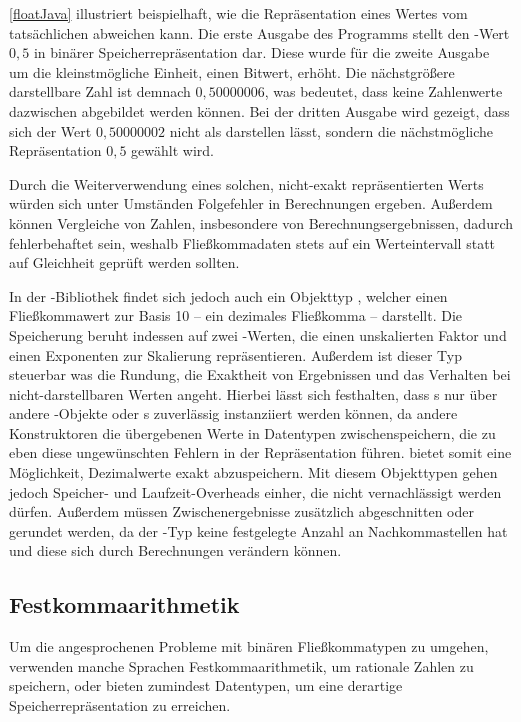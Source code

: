 \autoref{floatJava} illustriert beispielhaft, wie die Repräsentation eines Wertes vom tatsächlichen abweichen kann. Die erste Ausgabe des Programms stellt den -Wert $0,5$ in binärer Speicherrepräsentation dar. Diese wurde für die zweite Ausgabe um die kleinstmögliche Einheit, einen Bitwert, erhöht. Die nächstgrößere darstellbare Zahl ist demnach $0,50000006$, was bedeutet, dass keine Zahlenwerte dazwischen abgebildet werden können. Bei der dritten Ausgabe wird gezeigt, dass sich der Wert $0,50000002$ nicht als  darstellen lässt, sondern die nächstmögliche Repräsentation $0,5$ gewählt wird.

Durch die Weiterverwendung eines solchen, nicht-exakt repräsentierten Werts würden sich unter Umständen Folgefehler in Berechnungen ergeben. Außerdem können Vergleiche von Zahlen, insbesondere von Berechnungsergebnissen, dadurch fehlerbehaftet sein, weshalb Fließkommadaten stets auf ein Werteintervall statt auf Gleichheit geprüft werden sollten.

In der -Bibliothek findet sich jedoch auch ein Objekttyp , welcher einen Fließkommawert zur Basis 10 -- ein dezimales Fließkomma -- darstellt. Die Speicherung beruht in­des­sen auf zwei -Werten, die einen unskalierten Faktor und einen Exponenten zur Skalierung repräsentieren. Außerdem ist dieser Typ steuerbar was die Rundung, die Exaktheit von Ergebnissen und das Verhalten bei nicht-darstellbaren Werten angeht. Hierbei lässt sich festhalten, dass s nur über andere -Objekte oder s zuverlässig instanziiert werden können, da andere Konstruktoren die übergebenen Werte in Datentypen zwischenspeichern, die zu eben diese ungewünschten Fehlern in der Repräsentation führen.  bietet somit eine Möglichkeit, Dezimalwerte exakt abzuspeichern. Mit diesem Objekttypen gehen jedoch Speicher- und Laufzeit-Overheads einher, die nicht vernachlässigt werden dürfen. Außerdem müssen Zwischenergebnisse \idR zusätzlich abgeschnitten oder gerundet werden, da der -Typ keine festgelegte Anzahl an Nachkommastellen hat und diese sich durch Berechnungen verändern können.

\subsection*{Festkommaarithmetik}
Um die angesprochenen Probleme mit binären Fließkommatypen zu umgehen, verwenden manche Sprachen Festkommaarithmetik, um rationale Zahlen zu speichern, oder bieten zumindest Datentypen, um eine derartige Speicherrepräsentation zu erreichen. 

